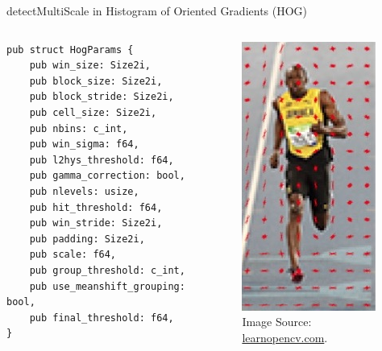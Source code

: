 \begin{frame}[fragile]{detectMultiScale in Histogram of Oriented Gradients (HOG)}
  \vspace{1em}
  \begin{columns}
    \centering
\begin{Verbatim}[fontsize=\scriptsize]
pub struct HogParams {
    pub win_size: Size2i,
    pub block_size: Size2i,
    pub block_stride: Size2i,
    pub cell_size: Size2i,
    pub nbins: c_int,
    pub win_sigma: f64,
    pub l2hys_threshold: f64,
    pub gamma_correction: bool,
    pub nlevels: usize,
    pub hit_threshold: f64,
    pub win_stride: Size2i,
    pub padding: Size2i,
    pub scale: f64,
    pub group_threshold: c_int,
    pub use_meanshift_grouping: bool,
    pub final_threshold: f64,
}
\end{Verbatim}
    \begin{figure}
      \centering
      \includegraphics[width=0.4\linewidth]{figures/hog.jpg}
      \caption{Image Source: \url{learnopencv.com}.}
    \end{figure}
  \end{columns}
\end{frame}

